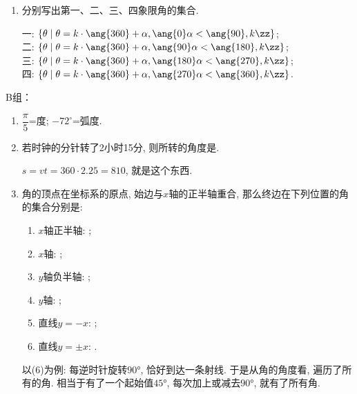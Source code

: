\begin{enumerate}
\item 分别写出第一、二、三、四象限角的集合. 
\begin{jieda}
一: $\{\theta\mid\theta=k\cdot\ang{360}+\alpha,\ang{0}\alpha<\ang{90},k\zz\}$; \\
二: $\{\theta\mid\theta=k\cdot\ang{360}+\alpha,\ang{90}\alpha<\ang{180},k\zz\}$; \\
三: $\{\theta\mid\theta=k\cdot\ang{360}+\alpha,\ang{180}\alpha<\ang{270},k\zz\}$; \\
四: $\{\theta\mid\theta=k\cdot\ang{360}+\alpha,\ang{270}\alpha<\ang{360},k\zz\}$. 
\end{jieda}


\end{enumerate}

B组：
\begin{enumerate}
\item $\dfrac{\pi}{5}$=度; $-72^{\circ}$=弧度.


\item 若时钟的分针转了2小时15分, 则所转的角度是. 
\begin{jieda}
$s=vt=360\cdot 2.25=810$, 就是这个东西. 
\end{jieda}


\item 角的顶点在坐标系的原点, 始边与$x$轴的正半轴重合, 那么终边在下列位置的角的集合分别是: 
\begin{enumerate}[(1)]
\item $x$轴正半轴: ; 
\item $x$轴: ; 
\item $y$轴负半轴: ; 
\item $y$轴: ; 
\item 直线$y=-x$: ; 
\item 直线$y=\pm{x}$: . 
\end{enumerate}
\begin{jieda}
以(6)为例: 每逆时针旋转$\ang{90}$, 恰好到达一条射线. 于是从角的角度看, 遍历了所有的角. 
相当于有了一个起始值$\ang{45}$, 每次加上或减去$\ang{90}$, 就有了所有角. 
\end{jieda}




\end{enumerate}
